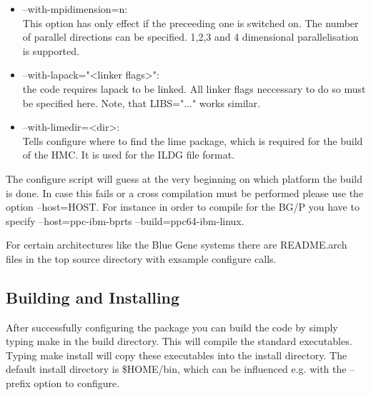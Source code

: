\begin{itemize}
\item {\ttfamily --with-mpidimension=n}:\\
  This option has only effect if the preceeding one is switched
  on. The number of parallel directions can be specified. 1,2,3 and 4
  dimensional parallelisation is supported.

\item {\ttfamily --with-lapack="<linker flags>"}:\\
  the code requires lapack to be linked. All linker flags neccessary
  to do so must be specified here. Note, that {\ttfamily LIBS="..."}
  works similar.

\item {\ttfamily --with-limedir=<dir>}:\\
  Tells configure where to find the lime package, which is required for
  the build of the HMC. It is used for the ILDG file format.
 
\end{itemize}

The configure script will guess at the very beginning on which
platform the build is done. In case this fails or a cross compilation
must be performed please use the option {\ttfamily --host=HOST}. For
instance in order to compile for the BG/P you have to specify
{\ttfamily --host=ppc-ibm-bprts --build=ppc64-ibm-linux}. 

For certain architectures like the Blue Gene systems there are
{\ttfamily README.arch} files in the top source directory with
exsample configure calls.

\subsection{Building and Installing}

After successfully configuring the package you can build the code by
simply typing {\ttfamily make} in the build directory. This will
compile the standard executables. Typing {\ttfamily make install} will
copy these executables into the install directory. The default install
directory is {\ttfamily \$HOME/bin}, which can be influenced e.g. with
the {\ttfamily --prefix} option to {\ttfamily configure}. 


